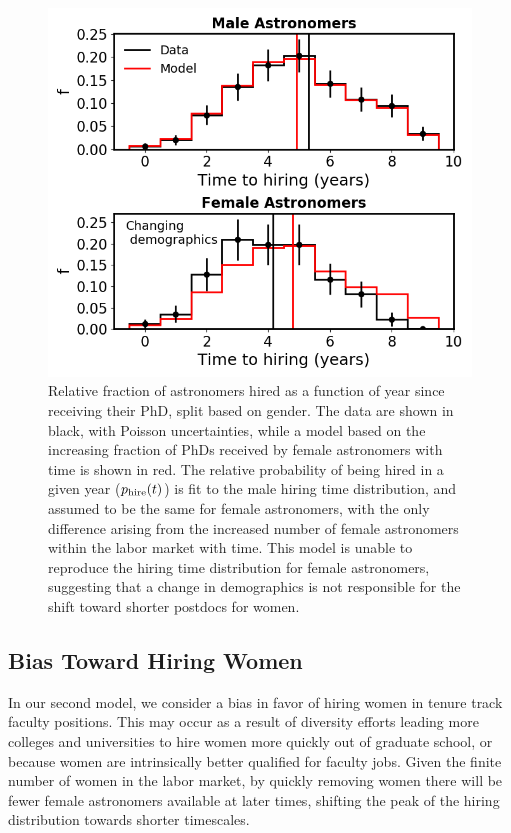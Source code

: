 \documentclass[modern]{aastex62}
\begin{document}
\begin{figure}[!hbt]
\center
\includegraphics[scale=.6]{model1.png}
\caption{Relative fraction of astronomers hired as a function of year since receiving their PhD, split based on gender. The data are shown in black, with Poisson uncertainties, while a model based on the increasing fraction of PhDs received by female astronomers with time is shown in red. The relative probability of being hired in a given year ($p_{\rm hire}(t)$) is fit to the male hiring time distribution, and assumed to be the same for female astronomers, with the only difference arising from the increased number of female astronomers within the labor market with time. This model is unable to reproduce the hiring time distribution for female astronomers, suggesting that a change in demographics is not responsible for the shift toward shorter postdocs for women.  \label{model1}}
\end{figure}
 

\subsection{Bias Toward Hiring Women}
In our second model, we consider a bias in favor of hiring women in tenure track faculty positions. This may occur as a result of diversity efforts leading more colleges and universities to hire women more quickly out of graduate school, or because women are intrinsically better qualified for faculty jobs. Given the finite number of women in the labor market, by quickly removing women there will be fewer female astronomers available at later times, shifting the peak of the hiring distribution towards shorter timescales.
\end{document}
